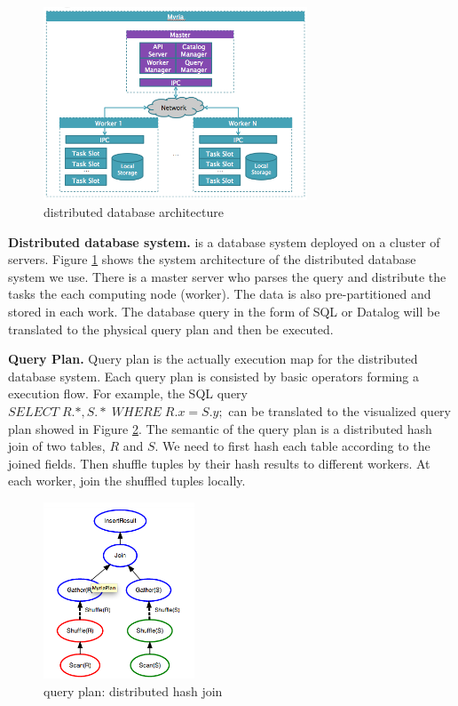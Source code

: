 \documentclass[11pt]{article}
\begin{document}
\begin{figure}
 \begin{center}
     \includegraphics[width=0.7\textwidth]{myria.png}
   \end{center}
  \caption{distributed database architecture}
  \label{fig:myria_arc}
\end{figure}


\noindent\textbf{Distributed database system.} is a database system deployed on a cluster of servers.  Figure \ref{fig:myria_arc} shows the system architecture of the distributed database system we use. There is a master server who parses the query and distribute the tasks the each computing node (worker). The data is also pre-partitioned and stored in each work.  The database query in the form of SQL or Datalog will be translated to the physical query plan and then be executed.

\noindent\textbf{Query Plan.} Query plan is the actually execution map for the distributed database system.  Each query plan is consisted by basic operators forming a execution flow.   For example,   the SQL query $SELECT \; R.*, S.*  \; WHERE \; R.x=S.y ;$ can be translated to the visualized query plan showed in Figure \ref{fig:query_plan}.  The semantic of the query plan is a distributed hash join of two tables, $R$ and $S$. We need to first hash each table according to the joined fields. Then shuffle tuples by their hash results to different workers. At each worker, join the shuffled tuples locally. 


\begin{figure}
 \begin{center}
     \includegraphics[width=0.4\textwidth]{partition_join.png}
   \end{center}
  \caption{query plan: distributed hash join}
  \label{fig:query_plan}
\end{figure}
\end{document}
